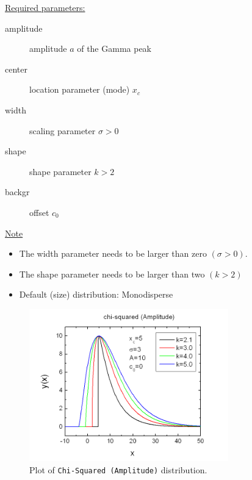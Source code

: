 \vspace{5mm}

\uline{Required parameters:}
\begin{description}
    \item[amplitude] amplitude $a$ of the Gamma peak
    \item[center] location parameter (mode) $x_c$
    \item[width] scaling parameter $\sigma>0$
    \item[shape] shape parameter $k>2$
    \item[backgr] offset $c_0$
\end{description}

\uline{Note}
\begin{itemize}
  \item The width parameter needs to be larger than zero $(\sigma>0)$.
  \item The shape parameter needs to be larger than two $(k>2)$
  \item Default (size) distribution: Monodisperse
\end{itemize}

\begin{figure}[htb]
\begin{center}
\includegraphics[width=0.768\textwidth]{ChiSquaredAmplitude.png}
\end{center}
\caption{Plot of \texttt{Chi-Squared (Amplitude)} distribution.}
\label{fig:ChiSquaredAmplitude}
\end{figure}
